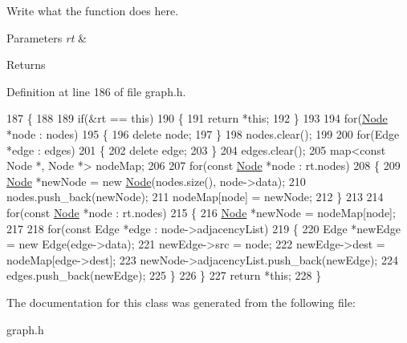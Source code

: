 Write what the function does here. 


\begin{DoxyParams}{Parameters}
{\em rt} & \\
\hline
\end{DoxyParams}
\begin{DoxyReturn}{Returns}

\end{DoxyReturn}


Definition at line 186 of file graph.\+h.


\begin{DoxyCode}
187         \{
188 
189             \textcolor{keywordflow}{if}(&rt == \textcolor{keyword}{this})
190             \{
191                 \textcolor{keywordflow}{return} *\textcolor{keyword}{this};
192             \}
193 
194             \textcolor{keywordflow}{for}(\hyperlink{classNode}{Node} *node : nodes)
195             \{
196                 \textcolor{keyword}{delete} node;
197             \}
198             nodes.clear();
199 
200             \textcolor{keywordflow}{for}(Edge *edge : edges)
201             \{
202                 \textcolor{keyword}{delete} edge;
203             \}
204             edges.clear();
205             map<const Node *, Node *> nodeMap;
206 
207             \textcolor{keywordflow}{for}(\textcolor{keyword}{const} \hyperlink{classNode}{Node} *node : rt.nodes)
208             \{
209                 \hyperlink{classNode}{Node} *newNode = \textcolor{keyword}{new} \hyperlink{classNode}{Node}(nodes.size(), node->data);
210                 nodes.push\_back(newNode);
211                 nodeMap[node] = newNode;
212             \}
213 
214             \textcolor{keywordflow}{for}(\textcolor{keyword}{const} \hyperlink{classNode}{Node} *node : rt.nodes)
215             \{
216                 \hyperlink{classNode}{Node} *newNode = nodeMap[node];
217 
218                 \textcolor{keywordflow}{for}(\textcolor{keyword}{const} Edge *edge : node->adjacencyList)
219                 \{
220                     Edge *newEdge = \textcolor{keyword}{new} Edge(edge->data);
221                     newEdge->src = node;
222                     newEdge->dest = nodeMap[edge->dest];
223                     newNode->adjacencyList.push\_back(newEdge);
224                     edges.push\_back(newEdge);
225                 \}
226             \}
227             \textcolor{keywordflow}{return} *\textcolor{keyword}{this};
228         \}
\end{DoxyCode}


The documentation for this class was generated from the following file\+:\begin{DoxyCompactItemize}
\item 
graph.\+h\end{DoxyCompactItemize}
